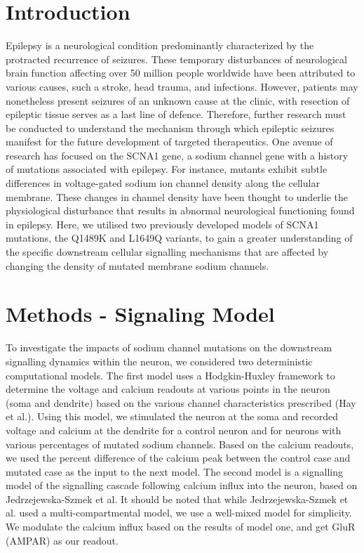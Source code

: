 \section{Introduction}
Epilepsy is a neurological condition predominantly characterized by the protracted recurrence of
seizures. These temporary disturbances of neurological brain function affecting over 50 million
people worldwide have been attributed to various causes, such a stroke, head trauma, and infections.
However, patients may nonetheless present seizures of an unknown cause at the clinic, with resection
of epileptic tissue serves as a last line of defence. Therefore, further research must be conducted
to understand the mechanism through which epileptic seizures manifest for the future development of
targeted therapeutics. One avenue of research has focused on the SCNA1 gene, a sodium channel gene
with a history of mutations associated with epilepsy. For instance, mutants exhibit subtle
differences in voltage-gated sodium ion channel density along the cellular membrane. These changes
in channel density have been thought to underlie the physiological disturbance that results in
abnormal neurological functioning found in epilepsy. Here, we utilised two previously developed
models of SCNA1 mutations, the Q1489K and L1649Q variants, to gain a greater understanding of the
specific downstream cellular signalling mechanisms that are affected by changing the density of
mutated membrane sodium channels.

\section*{Methods - Signaling Model}
To investigate the impacts of sodium channel mutations on the downstream signalling dynamics within
the neuron, we considered two deterministic computational models. The first model uses a
Hodgkin-Huxley framework to determine the voltage and calcium readouts at various points in the
neuron (soma and dendrite) based on the various channel characteristics prescribed (Hay et al.).
Using this model, we stimulated the neuron at the soma and recorded voltage and calcium at the
dendrite for a control neuron and for neurons with various percentages of mutated sodium channels.
Based on the calcium readouts, we used the percent difference of the calcium peak between the
control case and mutated case as the input to the next model. The second model is a signalling model
of the signalling cascade following calcium influx into the neuron, based on Jedrzejewska-Szmek et
al. It should be noted that while Jedrzejewska-Szmek et al. used a multi-compartmental model, we use
a well-mixed model for simplicity. We modulate the calcium influx based on the results of model one,
and get GluR (AMPAR) as our readout.


